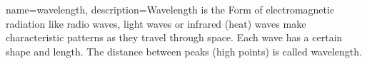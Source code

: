 {
    name=wavelength,
    description={Wavelength is the Form of electromagnetic radiation like radio waves, light waves or infrared (heat) waves make characteristic patterns as they travel through space. Each wave has a certain shape and length. The distance between peaks (high points) is called wavelength.}

}
